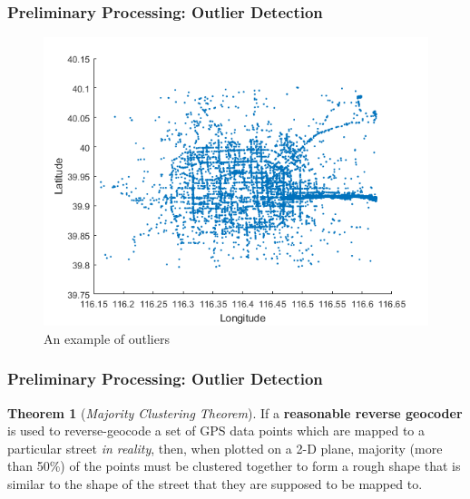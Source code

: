 \documentclass{beamer}
\theoremstyle{definition}
\newtheorem{thrm}{Theorem}
\begin{document}
\begin{frame}
\frametitle{Preliminary Processing: Outlier Detection}

\begin{figure}[h!]
\includegraphics[scale=0.58]{outlier}
\centering
\caption{An example of outliers}\label{Fig:outlier}
\end{figure}

\end{frame}


\begin{frame}
\frametitle{Preliminary Processing: Outlier Detection}

\begin{thrm}[\emph{Majority Clustering Theorem}]\label{Theorem: majority_clustering}
If a \textbf{reasonable reverse geocoder} is used to reverse-geocode a set of GPS data points which are mapped to a particular street \emph{in reality}, then, when plotted on a 2-D plane, majority (more than 50\%) of the points must be clustered together to form a rough shape that is similar to the shape of the street that they are supposed to be mapped to. 
\end{thrm}


\end{frame}
\end{document}
